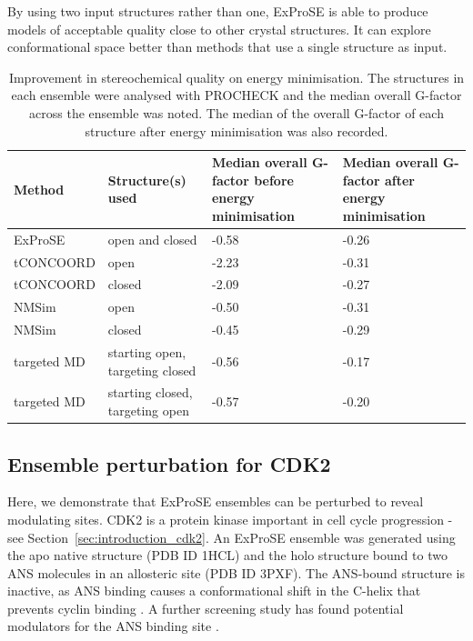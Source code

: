 By using two input structures rather than one, ExProSE is able to produce models of acceptable quality close to other crystal structures.
It can explore conformational space better than methods that use a single structure as input.


\begin{table}
\centering

\begin{footnotesize}
\begin{tabular}{ l l p{3cm} p{3cm} }
\hline
\textbf{Method} & \textbf{Structure(s) used} & \textbf{Median overall G-factor before energy minimisation} & \textbf{Median overall G-factor after energy minimisation} \\
\hline
ExProSE     & open and closed                 & -0.58 & -0.26 \\
tCONCOORD   & open                            & -2.23 & -0.31 \\
tCONCOORD   & closed                          & -2.09 & -0.27 \\
NMSim       & open                            & -0.50 & -0.31 \\
NMSim       & closed                          & -0.45 & -0.29 \\
targeted MD & starting open, targeting closed & -0.56 & -0.17 \\
targeted MD & starting closed, targeting open & -0.57 & -0.20 \\
\hline
\end{tabular}
\end{footnotesize}

\caption[Improvement in stereochemical quality of generated structures on energy minimisation]
{Improvement in stereochemical quality on energy minimisation.
The structures in each ensemble were analysed with PROCHECK and the median overall G-factor across the ensemble was noted.
The median of the overall G-factor of each structure after energy minimisation was also recorded.}

\label{tab:energy_minimisation}
\end{table}


\subsection{Ensemble perturbation for CDK2}

Here, we demonstrate that ExProSE ensembles can be perturbed to reveal modulating sites.
CDK2 is a protein kinase important in cell cycle progression - see Section~\ref{sec:introduction_cdk2}.
An ExProSE ensemble was generated using the apo native structure (PDB ID 1HCL) and the holo structure bound to two ANS molecules in an allosteric site (PDB ID 3PXF).
The ANS-bound structure is inactive, as ANS binding causes a conformational shift in the \textalpha C-helix that prevents cyclin binding \cite{Betzi2011}.
A further screening study has found potential modulators for the ANS binding site \cite{Rastelli2014}.

